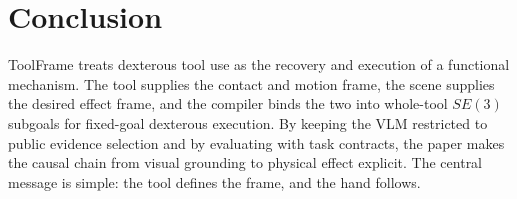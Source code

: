 \documentclass[journal]{IEEEtran}
\newcommand{\method}{ToolFrame}
\begin{document}
\section{Conclusion}
\method{} treats dexterous tool use as the recovery and execution of a
functional mechanism. The tool supplies the contact and motion frame, the scene
supplies the desired effect frame, and the compiler binds the two into
whole-tool $SE(3)$ subgoals for fixed-goal dexterous execution. By keeping the
VLM restricted to public evidence selection and by evaluating with task
contracts, the paper makes the causal chain from visual grounding to physical
effect explicit. The central message is simple: the tool defines the frame, and
the hand follows.



\end{document}
